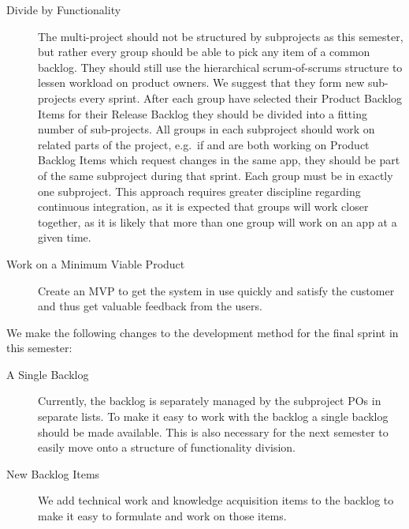 \begin{description}
  \item[Divide by Functionality] The multi-project should not be structured by subprojects as this semester, but rather every group should be able to pick any item of a common backlog. They should still use the hierarchical scrum-of-scrums structure to lessen workload on product owners. We suggest that they form new sub-projects every sprint. After each group have selected their Product Backlog Items for their Release Backlog they should be divided into a fitting number of sub-projects. All groups in each subproject should work on related parts of the project, e.g.\ if  and  are both working on Product Backlog Items which request changes in the same app, they should be part of the same subproject during that sprint. Each group must be in exactly one subproject. This approach requires greater discipline regarding continuous integration, as it is expected that groups will work closer together, as it is likely that more than one group will work on an app at a given time. 
  \item[Work on a Minimum Viable Product] Create an MVP to get the system in use quickly and satisfy the customer and thus get valuable feedback from the users.
\end{description}

We make the following changes to the development method for the final sprint in this semester:

\begin{description}
  \item[A Single Backlog] Currently, the backlog is separately managed by the subproject POs in separate lists. To make it easy to work with the backlog a single backlog should be made available. This is also necessary for the next semester to easily move onto a structure of functionality division.
  \item[New Backlog Items] We add technical work and knowledge acquisition items to the backlog to make it easy to formulate and work on those items.
\end{description}

